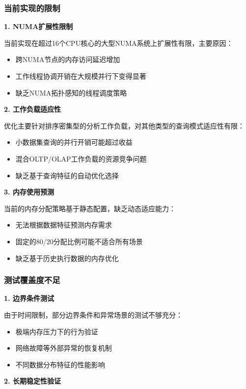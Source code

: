 \subsubsection{当前实现的限制}

\textbf{1. NUMA扩展性限制}

当前实现在超过16个CPU核心的大型NUMA系统上扩展性有限，主要原因：
\begin{itemize}
    \item 跨NUMA节点的内存访问延迟增加
    \item 工作线程协调开销在大规模并行下变得显著
    \item 缺乏NUMA拓扑感知的线程调度策略
\end{itemize}

\textbf{2. 工作负载适应性}

优化主要针对排序密集型的分析工作负载，对其他类型的查询模式适应性有限：
\begin{itemize}
    \item 小数据集查询的并行开销可能超过收益
    \item 混合OLTP/OLAP工作负载的资源竞争问题
    \item 缺乏基于查询特征的自动优化选择
\end{itemize}

\textbf{3. 内存使用预测}

当前的内存分配策略基于静态配置，缺乏动态适应能力：
\begin{itemize}
    \item 无法根据数据特征预测内存需求
    \item 固定的80/20分配比例可能不适合所有场景
    \item 缺乏基于历史执行数据的内存优化
\end{itemize}

\subsubsection{测试覆盖度不足}

\textbf{1. 边界条件测试}

由于时间限制，部分边界条件和异常场景的测试不够充分：
\begin{itemize}
    \item 极端内存压力下的行为验证
    \item 网络故障等外部异常的恢复机制
    \item 不同数据分布特征的性能影响
\end{itemize}

\textbf{2. 长期稳定性验证}

